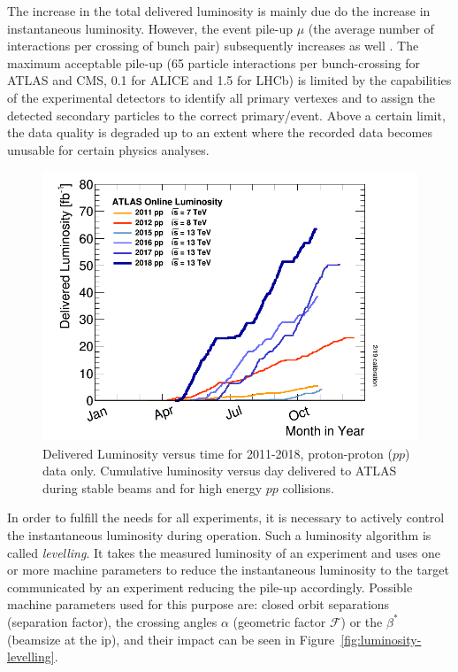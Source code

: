 \documentclass[encoding=utf8,british]{tumphthesis}
\begin{document}
\begin{minipage}[t]{0.375\linewidth}

The increase in the total delivered luminosity is mainly due do the increase in instantaneous luminosity. However, the event pile-up $\mu$ (the average number of interactions per crossing of bunch pair) subsequently increases as well \cite{Hostettler:2319396}. The maximum acceptable pile-up (65 particle interactions per bunch-crossing for ATLAS and CMS, 0.1 for ALICE and 1.5 for LHCb) is limited by the capabilities of the experimental detectors to identify all primary vertexes and to assign the detected secondary particles to the correct primary/event. Above a certain limit, the data quality is degraded up to an extent where the recorded data becomes unusable for certain physics analyses.


\end{minipage}%
\hspace{0.5cm}\hfill%
\begin{minipage}[t]{0.55\linewidth}

\begin{figure}[H]
    \centering
    \includegraphics[width=1.0\linewidth]{figures/intlumivsyear.png}
    \caption{Delivered Luminosity versus time for 2011-2018, proton-proton ($pp$) data only. Cumulative luminosity versus day delivered to ATLAS during stable beams and for high energy $pp$ collisions. \cite{Luminosities:ATLAS}}
    \label{fig:intlumivsyear-ATLAS}
\end{figure}

\end{minipage}


In order to fulfill the needs for all experiments, it is necessary to actively control the instantaneous luminosity during operation. Such a luminosity algorithm is called \emph{levelling}. It takes the measured luminosity of an experiment and uses one or more machine parameters to reduce the instantaneous luminosity to the target communicated by an experiment reducing the pile-up accordingly. Possible machine parameters used for this purpose are: closed orbit separations (separation factor), the crossing angles $\alpha$ (geometric factor $\mathcal{F}$) or the $\beta^*$ (beamsize at the \acrshort{ip}), and their impact can be seen in Figure~\ref{fig:luminosity-levelling}. 
\end{document}
